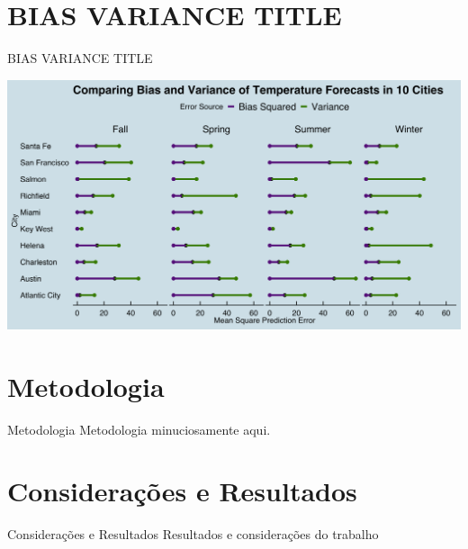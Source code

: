 \documentclass[handout,t]{beamer}
\begin{document}
\section{BIAS VARIANCE TITLE}
\begin{frame}{BIAS VARIANCE TITLE}
  \begin{center}
  \includegraphics[scale=0.06]{BiasVarGraph.png}
  \end{center}
\end{frame}

\section{Metodologia}
\begin{frame}{Metodologia}
Metodologia minuciosamente aqui.
\end{frame}

\section{Considerações e Resultados}
\begin{frame}{Considerações e Resultados}
Resultados e considerações do trabalho  
\end{frame}

\end{document}
